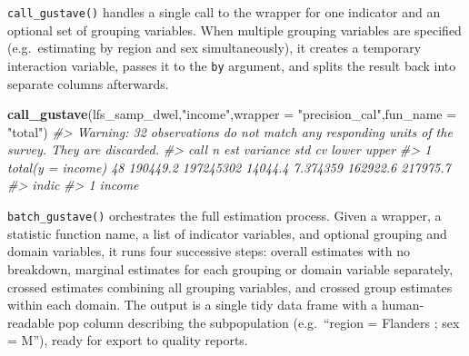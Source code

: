 \documentclass[
]{article}
\newenvironment{Shaded}{\begin{snugshade}}{\end{snugshade}}
\newcommand{\AttributeTok}[1]{\textcolor[rgb]{0.13,0.29,0.53}{#1}}
\newcommand{\CommentTok}[1]{\textcolor[rgb]{0.56,0.35,0.01}{\textit{#1}}}
\newcommand{\FunctionTok}[1]{\textcolor[rgb]{0.13,0.29,0.53}{\textbf{#1}}}
\newcommand{\NormalTok}[1]{#1}
\newcommand{\StringTok}[1]{\textcolor[rgb]{0.31,0.60,0.02}{#1}}
\begin{document}
\texttt{call\_gustave()} handles a single call to the wrapper for one
indicator and an optional set of grouping variables. When multiple
grouping variables are specified (e.g.~estimating by region and sex
simultaneously), it creates a temporary interaction variable, passes it
to the \texttt{by} argument, and splits the result back into separate
columns afterwards.

\begin{Shaded}
\begin{Highlighting}[]
\FunctionTok{call\_gustave}\NormalTok{(lfs\_samp\_dwel,}\StringTok{"income"}\NormalTok{,}\AttributeTok{wrapper =} \StringTok{"precision\_cal"}\NormalTok{,}\AttributeTok{fun\_name =} \StringTok{"total"}\NormalTok{)}
\CommentTok{\#\textgreater{} Warning: 32 observations do not match any responding units of the survey. They are discarded.}
\CommentTok{\#\textgreater{}                call  n      est  variance     std       cv    lower    upper}
\CommentTok{\#\textgreater{} 1 total(y = income) 48 190449.2 197245302 14044.4 7.374359 162922.6 217975.7}
\CommentTok{\#\textgreater{}    indic}
\CommentTok{\#\textgreater{} 1 income}
\end{Highlighting}
\end{Shaded}

\texttt{batch\_gustave()} orchestrates the full estimation process.
Given a wrapper, a statistic function name, a list of indicator
variables, and optional grouping and domain variables, it runs four
successive steps: overall estimates with no breakdown, marginal
estimates for each grouping or domain variable separately, crossed
estimates combining all grouping variables, and crossed group estimates
within each domain. The output is a single tidy data frame with a
human-readable pop column describing the subpopulation (e.g.~``region =
Flanders ; sex = M''), ready for export to quality reports.
\end{document}
